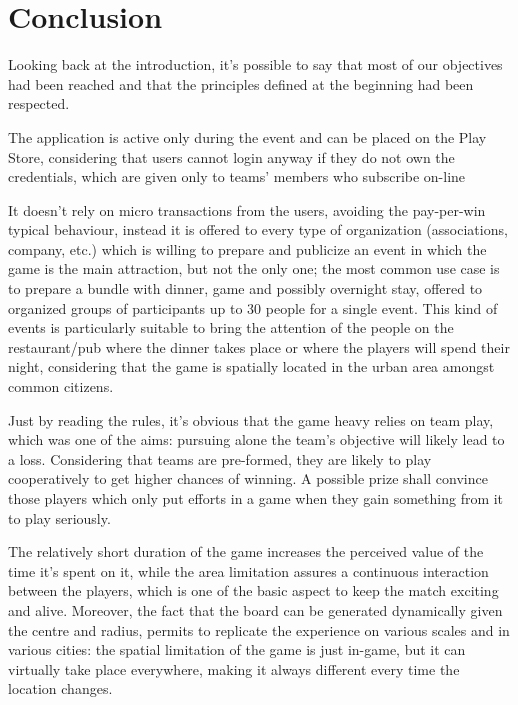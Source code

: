 \chapter{Conclusion}

	Looking back at the introduction, it's possible to say that most of our objectives had been reached and that the principles defined at the beginning had been respected.
	
	The application is active only during the event and can be placed on the Play Store, considering that users cannot login anyway if they do not own the credentials, which are given only to teams' members who subscribe on-line
	
	It doesn't rely on micro transactions from the users, avoiding the pay-per-win typical behaviour, instead it is offered to every type of organization (associations, company, etc.) which is willing to prepare and publicize an event in which the game is the main attraction, but not the only one; the most common use case is to prepare a bundle with dinner, game and possibly overnight stay, offered to organized groups of participants up to 30 people for a single event.
	This kind of events is particularly suitable to bring the attention of the people on the restaurant/pub where the dinner takes place or where the players will spend their night, considering that the game is spatially located in the urban area amongst common citizens.
	
	Just by reading the rules, it's obvious that the game heavy relies on team play, which was one of the aims: pursuing alone the team's objective will likely lead to a loss. Considering that teams are pre-formed, they are likely to play cooperatively to get higher chances of winning. A possible prize shall convince those players which only put efforts in a game when they gain something from it to play seriously.
	
	The relatively short duration of the game increases the perceived value of the time it's spent on it, while the area limitation assures a continuous interaction between the players, which is one of the basic aspect to keep the match exciting and alive. Moreover, the fact that the board can be generated dynamically given the centre and radius, permits to replicate the experience on various scales and in various cities: the spatial limitation of the game is just in-game, but it can virtually take place everywhere, making it always different every time the location changes. \\
	
